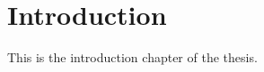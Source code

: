 \documentclass[
    11pt,
    a4paper,
    class=article,
    crop=false
]{standalone}
\begin{document}
\section{Introduction}\label{sec:intro}

This is the introduction chapter of the thesis.
\end{document}
